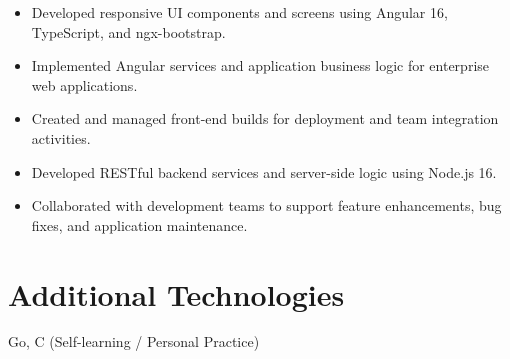 \documentclass[11pt,a4paper]{article}
\begin{document}
\begin{itemize}
    \item Developed responsive UI components and screens using Angular 16, TypeScript, and ngx-bootstrap.
    
    \item Implemented Angular services and application business logic for enterprise web applications.
    
    \item Created and managed front-end builds for deployment and team integration activities.
    
    \item Developed RESTful backend services and server-side logic using Node.js 16.
    
    \item Collaborated with development teams to support feature enhancements, bug fixes, and application maintenance.
\end{itemize}


\section*{Additional Technologies}
Go, C (Self-learning / Personal Practice)
\end{document}
